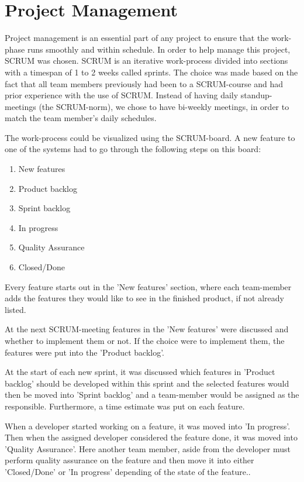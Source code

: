 \chapter{Project Management}
Project management is an essential part of any project to ensure that the work-phase runs smoothly and within schedule. In order to help manage this project, SCRUM was chosen. SCRUM is an iterative work-process divided into sections with a timespan of 1 to 2 weeks called sprints.
The choice was made based on the fact that all team members previously had been to a SCRUM-course and had prior experience with the use of SCRUM. Instead of having daily standup-meetings (the SCRUM-norm), we chose to have bi-weekly meetings, in order to match the team member's daily schedules.

The work-process could be visualized using the SCRUM-board. A new feature to one of the systems had to go through the following steps on this board:
\begin{enumerate}
	\item New features
	\item Product backlog
	\item Sprint backlog
	\item In progress
	\item Quality Assurance
	\item Closed/Done
\end{enumerate}

Every feature starts out in the 'New features' section, where each team-member adds the features they would like to see in the finished product, if not already listed.

At the next SCRUM-meeting features in the 'New features' were discussed and whether to implement them or not. If the choice were to implement them, the features were put into the 'Product backlog'.

At the start of each new sprint, it was discussed which features in 'Product backlog' should be developed within this sprint and the selected features would then be moved into 'Sprint backlog' and a team-member would be assigned as the responsible. Furthermore, a time estimate was put on each feature.

When a developer started working on a feature, it was moved into 'In progress'. Then when the assigned developer considered the feature done, it was moved into 'Quality Assurance'. Here another team member, aside from the developer must perform quality assurance on the feature and then move it into either 'Closed/Done' or 'In progress' depending of the state of the feature..

